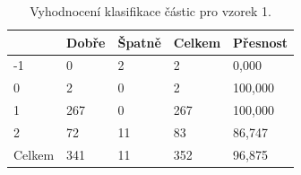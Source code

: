 \documentclass[11pt,twoside,a4paper,table]{book}
\begin{document}
\begin{table}[h!]
\begin{center}
\begin{tabular}{lllll}
\hline
\rowcolor[HTML]{9B9B9B} 
\multicolumn{1}{|l|}{\cellcolor[HTML]{9B9B9B}Třída} & \multicolumn{1}{l|}{\cellcolor[HTML]{9B9B9B}Dobře} & \multicolumn{1}{l|}{\cellcolor[HTML]{9B9B9B}Špatně} & \multicolumn{1}{l|}{\cellcolor[HTML]{9B9B9B}Celkem} & \multicolumn{1}{l|}{\cellcolor[HTML]{9B9B9B}Přesnost} \\ \hline
\multicolumn{1}{|l|}{-1}                            & \multicolumn{1}{l|}{0}                             & \multicolumn{1}{l|}{2}                               & \multicolumn{1}{l|}{2}                              & \multicolumn{1}{l|}{0,000}                            \\ \hline
\multicolumn{1}{|l|}{0}                             & \multicolumn{1}{l|}{2}                             & \multicolumn{1}{l|}{0}                               & \multicolumn{1}{l|}{2}                              & \multicolumn{1}{l|}{100,000}                          \\ \hline
\multicolumn{1}{|l|}{1}                             & \multicolumn{1}{l|}{267}                           & \multicolumn{1}{l|}{0}                               & \multicolumn{1}{l|}{267}                            & \multicolumn{1}{l|}{100,000}                          \\ \hline
\multicolumn{1}{|l|}{2}                             & \multicolumn{1}{l|}{72}                            & \multicolumn{1}{l|}{11}                              & \multicolumn{1}{l|}{83}                             & \multicolumn{1}{l|}{86,747}                           \\ \hline
\multicolumn{1}{|l|}{Celkem}                        & \multicolumn{1}{l|}{341}                           & \multicolumn{1}{l|}{11}                              & \multicolumn{1}{l|}{352}                            & \multicolumn{1}{l|}{96,875}                           \\ \hline
\end{tabular}
\end{center}
\caption{Vyhodnocení klasifikace částic pro vzorek 1.}
\label{tab:classresult1}
\end{table}

\newpage
\FloatBarrier
\end{document}
